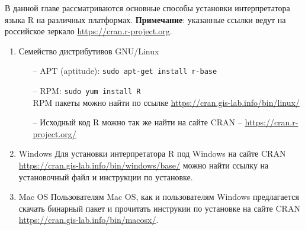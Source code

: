 В данной главе рассматриваются основные способы установки интерпретатора языка R на
различных платформах. \textbf{Примечание}: указанные ссылки ведут на российское зеркало \url{https://cran.r-project.org}.
\begin{enumerate}
    \item Семейство дистрибутивов GNU/Linux
        \begin{itemize}
            \item[--] APT (aptitude):
                \texttt{sudo apt-get install r-base}
            \item[--] RPM:
                \texttt{sudo yum install R} \\
                RPM пакеты можно найти по ссылке \url{https://cran.gis-lab.info/bin/linux/}
            \item[--] Исходный код R можно так же найти на сайте CRAN -- \url{https://cran.r-project.org/}
        \end{itemize}
    \item Windows
        Для установки интерпретатора R под Windows на сайте CRAN \url{https://cran.gis-lab.info/bin/windows/base/}
        можно найти ссылку на установочный файл и инструкции по установке.
    \item Mac OS
        Пользователям Mac OS, как и пользователям Windows предлагается скачать бинарный пакет и прочитать инструкии
        по установке на сайте CRAN \url{https://cran.gis-lab.info/bin/macosx/}.
\end{enumerate} 
